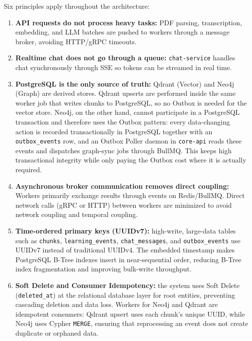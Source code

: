 Six principles apply throughout the architecture:

\begin{enumerate}
    \item \textbf{API requests do not process heavy tasks:} PDF parsing,
          transcription, embedding, and LLM batches are pushed to workers
          through a message broker, avoiding HTTP/gRPC timeouts.
    \item \textbf{Realtime chat does not go through a queue:}
          \texttt{chat-service} handles chat synchronously through SSE so
          tokens can be streamed in real time.
    \item \textbf{PostgreSQL is the only source of truth:} Qdrant (Vector)
          and Neo4j (Graph) are derived stores. Qdrant upserts are
          performed inside the same worker job that writes chunks to
          PostgreSQL, so no Outbox is needed for the vector store. Neo4j,
          on the other hand, cannot participate in a PostgreSQL
          transaction and therefore uses the Outbox pattern: every
          data-changing action is recorded transactionally in
          PostgreSQL together with an \texttt{outbox\_events} row, and an
          Outbox Poller daemon in \texttt{core-api} reads these events
          and dispatches graph-sync jobs through BullMQ. This keeps
          high transactional integrity while only paying the Outbox cost
          where it is actually required.
    \item \textbf{Asynchronous broker communication removes direct
          coupling:} Workers primarily exchange results through events on
          Redis/BullMQ. Direct network calls (gRPC or HTTP) between workers
          are minimized to avoid network coupling and temporal coupling.
    \item \textbf{Time-ordered primary keys (UUIDv7):} high-write,
          large-data tables such as \texttt{chunks},
          \texttt{learning\_events}, \texttt{chat\_messages}, and
          \texttt{outbox\_events} use UUIDv7 instead of traditional UUIDv4.
          The embedded timestamp makes PostgreSQL B-Tree indexes insert in
          near-sequential order, reducing B-Tree index fragmentation and
          improving bulk-write throughput.
    \item \textbf{Soft Delete and Consumer Idempotency:} the system uses
          Soft Delete (\texttt{deleted\_at}) at the relational database
          layer for root entities, preventing cascading deletion and data
          loss. Workers for Neo4j and Qdrant are idempotent consumers:
          Qdrant upsert uses each chunk's unique UUID, while Neo4j uses
          Cypher \texttt{MERGE}, ensuring that reprocessing an event does
          not create duplicate or orphaned data.
\end{enumerate}

